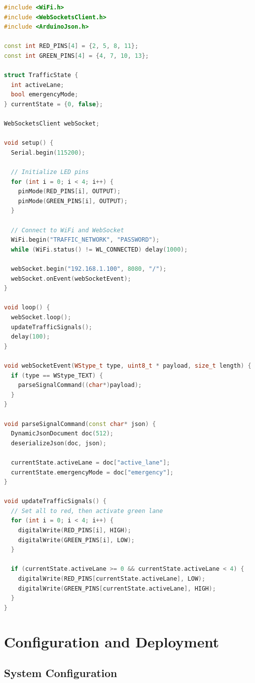 \begin{lstlisting}[language=C++, caption=Arduino Traffic Signal Controller, label=lst:arduino_code]
#include <WiFi.h>
#include <WebSocketsClient.h>
#include <ArduinoJson.h>

const int RED_PINS[4] = {2, 5, 8, 11};
const int GREEN_PINS[4] = {4, 7, 10, 13};

struct TrafficState {
  int activeLane;
  bool emergencyMode;
} currentState = {0, false};

WebSocketsClient webSocket;

void setup() {
  Serial.begin(115200);
  
  // Initialize LED pins
  for (int i = 0; i < 4; i++) {
    pinMode(RED_PINS[i], OUTPUT);
    pinMode(GREEN_PINS[i], OUTPUT);
  }
  
  // Connect to WiFi and WebSocket
  WiFi.begin("TRAFFIC_NETWORK", "PASSWORD");
  while (WiFi.status() != WL_CONNECTED) delay(1000);
  
  webSocket.begin("192.168.1.100", 8080, "/");
  webSocket.onEvent(webSocketEvent);
}

void loop() {
  webSocket.loop();
  updateTrafficSignals();
  delay(100);
}

void webSocketEvent(WStype_t type, uint8_t * payload, size_t length) {
  if (type == WStype_TEXT) {
    parseSignalCommand((char*)payload);
  }
}

void parseSignalCommand(const char* json) {
  DynamicJsonDocument doc(512);
  deserializeJson(doc, json);
  
  currentState.activeLane = doc["active_lane"];
  currentState.emergencyMode = doc["emergency"];
}

void updateTrafficSignals() {
  // Set all to red, then activate green lane
  for (int i = 0; i < 4; i++) {
    digitalWrite(RED_PINS[i], HIGH);
    digitalWrite(GREEN_PINS[i], LOW);
  }
  
  if (currentState.activeLane >= 0 && currentState.activeLane < 4) {
    digitalWrite(RED_PINS[currentState.activeLane], LOW);
    digitalWrite(GREEN_PINS[currentState.activeLane], HIGH);
  }
}
\end{lstlisting}

\section{Configuration and Deployment}
\label{app:config_deployment}

\subsection{System Configuration}

